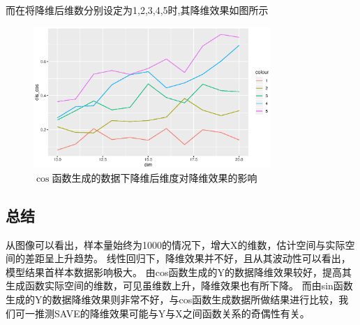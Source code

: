 而在将降维后维数分别设定为1,2,3,4,5时,其降维效果如图所示
\begin{figure}[H]
    \centering
    \includegraphics[width=0.8\textwidth]{image/compare_dim_save.eps}
    \caption{$\cos$函数生成的数据下降维后维度对降维效果的影响}
\end{figure}

\subsection{总结}
从图像可以看出，样本量始终为1000的情况下，增大X的维数，估计空间与实际空间的差距呈上升趋势。
线性回归下，降维效果并不好，且从其波动性可以看出，模型结果首样本数据影响极大。
由cos函数生成的Y的数据降维效果较好，提高其生成函数实际空间的维数，可见虽维数上升，降维效果也有所下降。
而由sin函数生成的Y的数据降维效果则非常不好，与cos函数生成数据所做结果进行比较，我们可一推测SAVE的降维效果可能与Y与X之间函数关系的奇偶性有关。